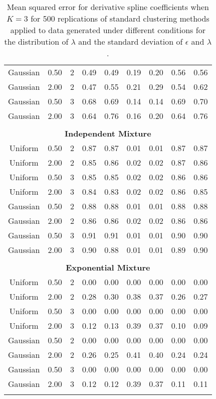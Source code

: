 \begin{table}[ht]
\begin{tabular}{ccc|cccccc}
  Gaussian & 0.50 &   2 & 0.49 & 0.49 & 0.19 & 0.20 & 0.56 & 0.56 \\ 
  Gaussian & 2.00 &   2 & 0.47 & 0.55 & 0.21 & 0.29 & 0.54 & 0.62 \\ 
  Gaussian & 0.50 &   3 & 0.68 & 0.69 & 0.14 & 0.14 & 0.69 & 0.70 \\ 
  Gaussian & 2.00 &   3 & 0.64 & 0.76 & 0.16 & 0.20 & 0.64 & 0.76 \\ 
   \\ \multicolumn{9}{c}{\textbf{Independent Mixture}}\\Uniform & 0.50 &   2 & 0.87 & 0.87 & 0.01 & 0.01 & 0.87 & 0.87 \\ 
  Uniform & 2.00 &   2 & 0.85 & 0.86 & 0.02 & 0.02 & 0.87 & 0.86 \\ 
  Uniform & 0.50 &   3 & 0.85 & 0.85 & 0.02 & 0.02 & 0.86 & 0.86 \\ 
  Uniform & 2.00 &   3 & 0.84 & 0.83 & 0.02 & 0.02 & 0.86 & 0.85 \\ 
  Gaussian & 0.50 &   2 & 0.88 & 0.88 & 0.01 & 0.01 & 0.88 & 0.88 \\ 
  Gaussian & 2.00 &   2 & 0.86 & 0.86 & 0.02 & 0.02 & 0.86 & 0.86 \\ 
  Gaussian & 0.50 &   3 & 0.91 & 0.91 & 0.01 & 0.01 & 0.90 & 0.90 \\ 
  Gaussian & 2.00 &   3 & 0.90 & 0.88 & 0.01 & 0.01 & 0.89 & 0.90 \\ 
   \\ \multicolumn{9}{c}{\textbf{Exponential Mixture}}\\Uniform & 0.50 &   2 & 0.00 & 0.00 & 0.00 & 0.00 & 0.00 & 0.00 \\ 
  Uniform & 2.00 &   2 & 0.28 & 0.30 & 0.38 & 0.37 & 0.26 & 0.27 \\ 
  Uniform & 0.50 &   3 & 0.00 & 0.00 & 0.00 & 0.00 & 0.00 & 0.00 \\ 
  Uniform & 2.00 &   3 & 0.12 & 0.13 & 0.39 & 0.37 & 0.10 & 0.09 \\ 
  Gaussian & 0.50 &   2 & 0.00 & 0.00 & 0.00 & 0.00 & 0.00 & 0.00 \\ 
  Gaussian & 2.00 &   2 & 0.26 & 0.25 & 0.41 & 0.40 & 0.24 & 0.24 \\ 
  Gaussian & 0.50 &   3 & 0.00 & 0.00 & 0.00 & 0.00 & 0.00 & 0.00 \\ 
  Gaussian & 2.00 &   3 & 0.12 & 0.12 & 0.39 & 0.37 & 0.11 & 0.11 \\ 
   \thickhline\end{tabular}
\caption{Mean squared error for derivative spline coefficients when $K=3$ for 500 replications of standard clustering methods applied to data generated under different conditions for the distribution of $\lambda$ and the standard deviation of $\epsilon$ and $\lambda$.}
\label{tab:mse1}

\end{table}
